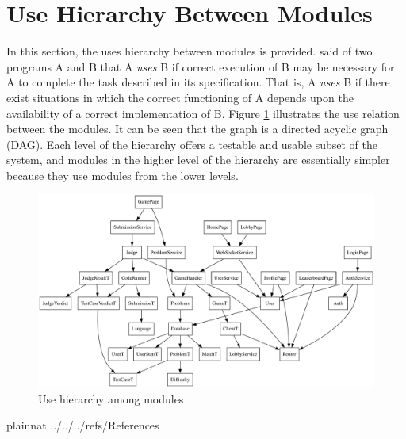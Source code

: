 \documentclass[12pt, titlepage]{article}
\begin{document}
\section{Use Hierarchy Between Modules} \label{SecUse}

In this section, the uses hierarchy between modules is
provided. \citet{Parnas1978} said of two programs A and B that A {\em uses} B if
correct execution of B may be necessary for A to complete the task described in
its specification. That is, A {\em uses} B if there exist situations in which
the correct functioning of A depends upon the availability of a correct
implementation of B.  Figure \ref{FigUH} illustrates the use relation between
the modules. It can be seen that the graph is a directed acyclic graph
(DAG). Each level of the hierarchy offers a testable and usable subset of the
system, and modules in the higher level of the hierarchy are essentially simpler
because they use modules from the lower levels.

\begin{figure}[H]
\centering
\includegraphics[width=1\textwidth]{UseHierarchy.pdf}
\caption{Use hierarchy among modules}

\label{FigUH}
\end{figure}


 {plainnat}
 {../../../refs/References}

\newpage{}
\end{document}
